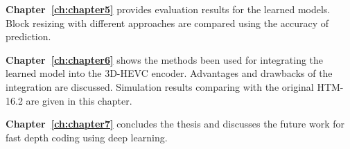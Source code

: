 \textbf{Chapter~\ref{ch:chapter5}} provides evaluation results for the
learned models.
Block resizing with different approaches are compared using the accuracy of
prediction.

\textbf{Chapter~\ref{ch:chapter6}} shows the methods been used for integrating
the learned model into the 3D-HEVC encoder.
Advantages and drawbacks of the integration are discussed.
Simulation results comparing with the original HTM-16.2 are given in this
chapter.

\textbf{Chapter~\ref{ch:chapter7}} concludes the thesis and discusses the future
work for fast depth coding using deep learning.



%
%

